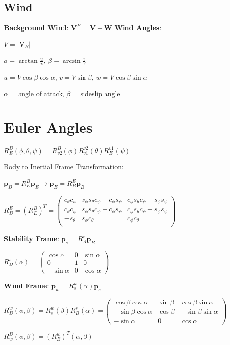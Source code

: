 \documentclass{article}
\begin{document}
\begin{multicols*}{2}
\subsection*{Wind}
\textbf{Background Wind}: $\mathbf{V}^E=\mathbf{V}+\mathbf{W}$
\textbf{Wind Angles}:\par 
$V = |\mathbf{V}_B|$\par
$a=\arctan{\frac{w}{u}}$, $\beta=\arcsin{\frac{v}{V}}$\par 
$u = V\cos{\beta}\cos{\alpha}$, $v=V\sin{\beta}$, $w=V\cos{\beta}\sin{\alpha}$\par 
$\alpha$ = angle of attack, $\beta$ = sideslip angle
\section*{Euler Angles}
$R_E^B(\phi,\theta,\psi)=R_{v2}^B(\phi)R_{v1}^{v2}(\theta)R_E^{v1}(\psi)$\par 
Body to Inertial Frame Transformation:\par 
$\mathbf{p}_B=R_E^B\mathbf{p}_E \rightarrow \mathbf{p}_E=R_B^E\mathbf{p}_B$\par 
$R_B^E=(R_E^B)^{T}=
\begin{pmatrix}
    c_{\theta}c_{\psi} & s_{\phi}s_{\theta}c_{\psi}-c_{\phi}s_{\psi} & c_{\phi}s_{\theta}c_{\psi}+s_{\phi}s_{\psi}\\
    c_{\theta}c_{\psi} & s_{\phi}s_{\theta}c_{\psi}+c_{\phi}s_{\psi} & c_{\phi}s_{\theta}c_{\psi}-s_{\phi}s_{\psi}\\
    -s_{\theta} & s_{\phi}c_{\theta} & c_{\phi}c_{\theta}\\
\end{pmatrix}$\par 
\textbf{Stability Frame}: $\mathbf{p}_s=R_B^s\mathbf{p}_B$\par 
$R_B^s(\alpha)=
\begin{pmatrix}
    \cos{\alpha} & 0 & \sin{\alpha}\\
    0 & 1 & 0\\
    -\sin{\alpha} & 0 & \cos{\alpha}
\end{pmatrix}$\par
\textbf{Wind Frame}: $\mathbf{p}_w=R_s^w(\alpha)\mathbf{p}_s$\par
$R_B^w(\alpha,\beta)=R_s^w(\beta)R_B^s(\alpha) = 
\begin{pmatrix}
    \cos{\beta}\cos{\alpha} & \sin{\beta} & \cos{\beta}\sin{\alpha}\\
    -\sin{\beta}\cos{\alpha} & \cos{\beta} & -\sin{\beta}\sin{\alpha}\\
    -\sin{\alpha} & 0 & \cos{\alpha}
\end{pmatrix}$\par 
$R_w^B(\alpha,\beta)=(R_B^w)^T(\alpha,\beta)$

\end{multicols*}
\end{document}
